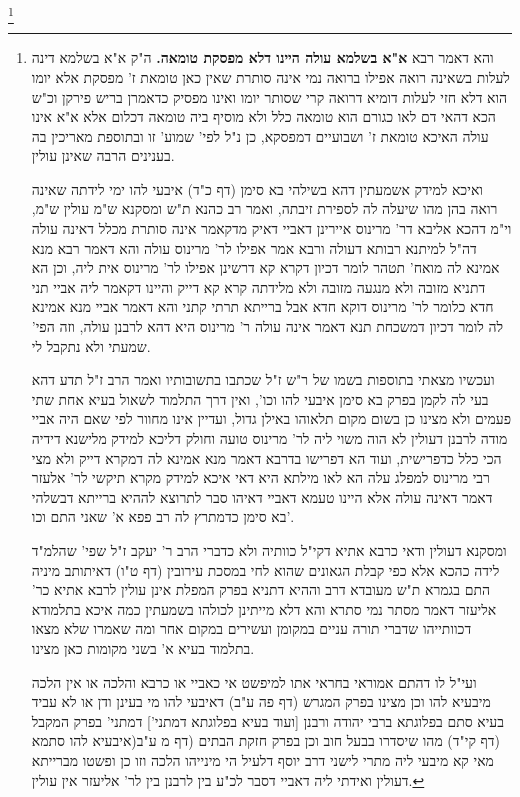 \documentclass[12pt, openany]{book}
\newcommand{\footnotecomment}[1]{
	\renewcommand\thefootnote{}
	\footnote{#1}}
\newcommand{\commenta}[1]{\footnotecomment{#1}}
\begin{document}
{\commenta{והא דאמר רבא \textbf{א"א בשלמא עולה היינו דלא מפסקת טומאה.} ה"ק א"א בשלמא דינה לעלות בשאינה רואה אפילו ברואה נמי אינה סותרת שאין כאן טומאת ז' מפסקת אלא יומו הוא דלא חזי לעלות דומיא דרואה קרי שסותר יומו ואינו מפסיק כדאמרן בריש פירקן וכ"ש הכא דהאי דם לאו כגורם הוא טומאה כלל ולא מוסיף ביה טומאה דכלום אלא א"א אינו עולה האיכא טומאת ז' ושבועיים דמפסקא, כן נ"ל לפי' שמוע' זו ובתוספת מאריכין בה בענינים הרבה שאינן עולין.\par ואיכא למידק אשמעתין דהא בשילהי בא סימן (דף כ"ד) איבעי להו ימי לידתה שאינה רואה בהן מהו שיעלה לה לספירת זיבתה, ואמר רב כהנא ת"ש ומסקנא ש"מ עולין ש"מ, וי"מ דהכא אליבא דר' מרינוס איירינן דאביי דאיק מדקאמר אינה סותרת מכלל דאינה עולה דה"ל למיתנא רבותא דעולה ורבא אמר אפילו לר' מרינוס עולה והא דאמר רבא מנא אמינא לה מואח' תטהר לומר דכיון דקרא קא דרשינן אפילו לר' מרינוס אית ליה, וכן הא דתניא מזובה ולא מנגעה מזובה ולא מלידתה קרא קא דייק והיינו דקאמר ליה אביי תני חדא כלומר לר' מרינוס דוקא חדא אבל ברייתא תרתי קתני והא דאמר אביי מנא אמינא לה לומר דכיון דמשכחת תנא דאמר אינה עולה ר' מרינוס היא דהא לרבנן עולה, וזה הפי' שמעתי ולא נתקבל לי.\par ועכשיו מצאתי בתוספות בשמו של ר"ש ז"ל שכתבו בתשובותיו ואמר הרב ז"ל תדע דהא בעי לה לקמן בפרק בא סימן איבעי להו וכו', ואין דרך התלמוד לשאול בעיא אחת שתי פעמים ולא מצינו כן בשום מקום תלאוהו באילן גדול, ועדיין אינו מחוור לפי שאם היה אביי מודה לרבנן דעולין לא הוה משוי ליה לר' מרינוס טועה וחולק דליכא למידק מלישנא דידיה הכי כלל כדפרישית, ועוד הא דפרישו בדרבא דאמר מנא אמינא לה דמקרא דייק ולא מצי רבי מרינוס למפלג עלה הא לאו מילתא היא דאי איכא למידק מקרא תיקשי לר' אלעזר דאמר דאינה עולה אלא היינו טעמא דאביי דאיהו סבר לתרוצא לההיא ברייתא דבשלהי בא סימן כדמתרץ לה רב פפא א' שאני התם וכו'.\par ומסקנא דעולין ודאי כרבא אתיא דקי"ל כוותיה ולא כדברי הרב ר' יעקב ז"ל שפי' שהלמ"ד לידה כהכא אלא כפי קבלת הגאונים שהוא לחי במסכת עירובין (דף ט"ו) דאיתותב מיניה התם בגמרא ת"ש מעובדא דרב וההיא דתניא בפרק המפלת אינן עולין לרבא אתיא כר' אליעזר דאמר מסתר נמי סתרא והא דלא מייתינן לכולהו בשמעתין כמה איכא בתלמודא דכוותייהו שדברי תורה עניים במקומן ועשירים במקום אחר ומה שאמרו שלא מצאו בתלמוד בעיא א' בשני מקומות כאן מצינו.\par ועי"ל לו דהתם אמוראי בחראי אתו למיפשט אי כאביי או כרבא והלכה או אין הלכה מיבעיא להו וכן מצינו בפרק המגרש (דף פה ע"ב) דאיבעי להו מי בעינן ודן או לא עביד בעיא סתם בפלוגתא ברבי יהודה ורבנן [ועוד בעיא בפלוגתא דמתני'] דמתני' בפרק המקבל (דף קי"ד) מהו שיסדרו בבעל חוב וכן בפרק חזקת הבתים (דף מ ע"ב(איבעיא להו סתמא מאי קא מיבעי ליה מתרי לישני דרב יוסף דלעיל הי מינייהו הלכה וזו כן ופשטו מברייתא דעולין ואידתי ליה דאביי דסבר לכ"ע בין לרבנן בין לר' אליעזר אין עולין. }
}
\end{document}
